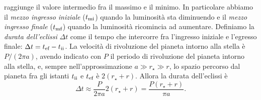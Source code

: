 raggiunge il valore intermedio fra il massimo e il minimo. In particolare
abbiamo il \emph{mezzo ingresso iniziale} ($t_{\textup{mi}}$) quando la
luminosità sta diminuendo e il \emph{mezzo ingresso finale} ($t_{\textup{mf}}$)
quando la luminosità ricomincia ad aumentare. Definiamo la
\emph{durata dell'eclissi} $\Delta t$ come il tempo che intercorre fra
l'ingresso iniziale e l'egresso finale:
$\Delta t = t_{\textup{ef}} - t_{\textup{ii}}$. La velocità di rivoluzione del
pianeta intorno alla stella è $P/(2\pi a)$, avendo indicato con $P$ il periodo
di rivoluzione del pianeta intorno alla stella, e, sempre nell'approssimazione
$a \gg r_\star \gg r$, lo spazio percorso dal pianeta fra gli istanti
$t_{\textup{ii}}$ e $t_{\textup{ef}}$ è $2(r_\star + r)$. Allora la durata
dell'eclissi è
\begin{equation}
  \Delta t \approx \frac{P}{2\pi a}2(r_\star + r) = \frac{P(r_\star + r)}{\pi
    a}.
\end{equation}


